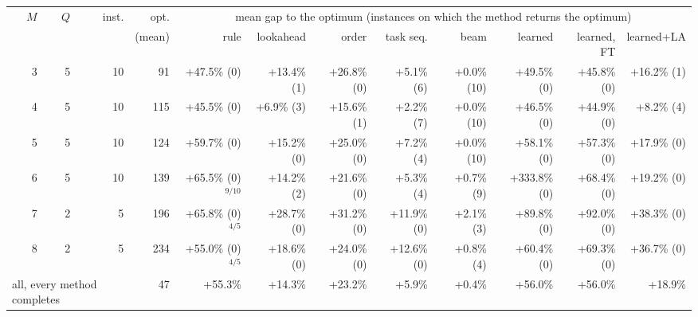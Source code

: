 \begin{tabular}{rrrrrrrrrrrr}
\toprule
$M$ & $Q$ & inst. & opt. & \multicolumn{8}{c}{mean gap to the optimum (instances on which the method returns the optimum)} \\
\cmidrule(lr){5-12}
& & & (mean) & rule & lookahead & order & task seq. & beam & learned & learned, FT & learned+LA \\
\midrule
3 & 5 & 10 & 91 & +47.5\% (0) & +13.4\% (1) & +26.8\% (0) & +5.1\% (6) & +0.0\% (10) & +49.5\% (0) & +45.8\% (0) & +16.2\% (1) \\
4 & 5 & 10 & 115 & +45.5\% (0) & +6.9\% (3) & +15.6\% (1) & +2.2\% (7) & +0.0\% (10) & +46.5\% (0) & +44.9\% (0) & +8.2\% (4) \\
5 & 5 & 10 & 124 & +59.7\% (0) & +15.2\% (0) & +25.0\% (0) & +7.2\% (4) & +0.0\% (10) & +58.1\% (0) & +57.3\% (0) & +17.9\% (0) \\
6 & 5 & 10 & 139 & +65.5\% (0)$^{9/10}$ & +14.2\% (2) & +21.6\% (0) & +5.3\% (4) & +0.7\% (9) & +333.8\% (0) & +68.4\% (0) & +19.2\% (0) \\
7 & 2 & 5 & 196 & +65.8\% (0)$^{4/5}$ & +28.7\% (0) & +31.2\% (0) & +11.9\% (0) & +2.1\% (3) & +89.8\% (0) & +92.0\% (0) & +38.3\% (0) \\
8 & 2 & 5 & 234 & +55.0\% (0)$^{4/5}$ & +18.6\% (0) & +24.0\% (0) & +12.6\% (0) & +0.8\% (4) & +60.4\% (0) & +69.3\% (0) & +36.7\% (0) \\
\midrule
\multicolumn{3}{l}{all, every method completes} & 47 & +55.3\% & +14.3\% & +23.2\% & +5.9\% & +0.4\% & +56.0\% & +56.0\% & +18.9\% \\
\bottomrule
\end{tabular}%
